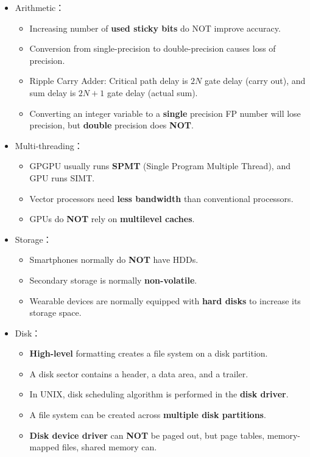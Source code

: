 \begin{itemize}
\begin{itemize}
    \end{itemize}
    \item Arithmetic： \begin{itemize}
        \item Increasing number of \textbf{used sticky bits} do NOT improve accuracy.
        \item Conversion from single-precision to double-precision causes loss of precision.
        \item Ripple Carry Adder: Critical path delay is $2N$ gate delay (carry out), and sum delay is $2N + 1$ gate delay (actual sum).
        \item Converting an integer variable to a \textbf{single} precision FP number will lose precision, but \textbf{double} precision does \textbf{NOT}.
    \end{itemize}
    \item Multi-threading： \begin{itemize}
        \item GPGPU usually runs \textbf{SPMT} (Single Program Multiple Thread), and GPU runs SIMT.
        \item Vector processors need \textbf{less bandwidth} than conventional processors.
        \item GPUs do \textbf{NOT} rely on \textbf{multilevel caches}.
    \end{itemize}
    \item Storage： \begin{itemize}
        \item Smartphones normally do \textbf{NOT} have HDDs.
        \item Secondary storage is normally \textbf{non-volatile}.
        \item Wearable devices are normally equipped with \textbf{hard disks} to increase its storage space.
    \end{itemize}
    \item Disk： \begin{itemize}
        \item \textbf{High-level} formatting creates a file system on a disk partition.
        \item A disk sector contains a header, a data area, and a trailer.
        \item In UNIX, disk scheduling algorithm is performed in the \textbf{disk driver}.
        \item A file system can be created across \textbf{multiple disk partitions}.
        \item \textbf{Disk device driver} can \textbf{NOT} be paged out, but page tables, memory-mapped files, shared memory can.

\end{itemize}
\end{itemize}
